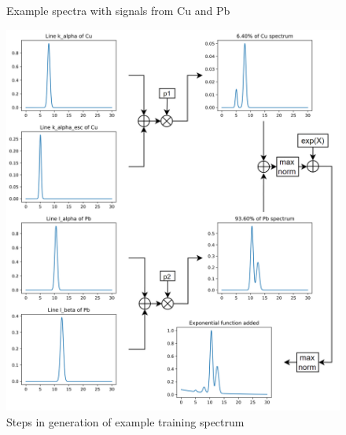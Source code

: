 \begin{figure}[H] 
  \centering     
   
  \caption{Example spectra with signals from Cu and Pb}
  \label{fig:sum-spectras}
\end{figure}

\begin{figure}[] 
  \centering     
  \includegraphics[width=1\textwidth]{img/generation_pipeline.png} 
  \caption{Steps in generation of example training spectrum}
  \label{fig:training_data_generation}
\end{figure}
